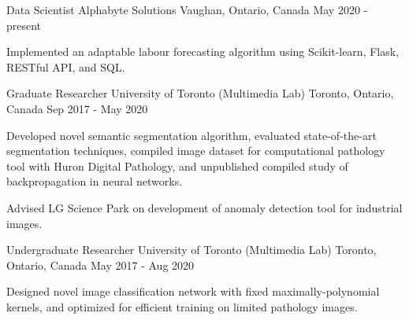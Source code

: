 

\begin{cventries}

  \cventry
    {Data Scientist} %
    {Alphabyte Solutions} %
    {Vaughan, Ontario, Canada} %
    {May 2020 - present} %
    {
      \begin{cvitems} %
        \item {Implemented an adaptable labour forecasting algorithm using Scikit-learn, Flask, RESTful API, and SQL.}
      \end{cvitems}
    }

  \cventry
    {Graduate Researcher} %
    {University of Toronto (Multimedia Lab)} %
    {Toronto, Ontario, Canada} %
    {Sep 2017 - May 2020} %
    {
      \begin{cvitems} %
        \item {Developed novel semantic segmentation algorithm, evaluated state-of-the-art segmentation techniques, compiled image dataset for computational pathology tool with Huron Digital Pathology, and unpublished compiled study of backpropagation in neural networks.}
        \item {Advised LG Science Park on development of anomaly detection tool for industrial images.}
      \end{cvitems}
    }

  \cventry
    {Undergraduate Researcher} %
    {University of Toronto (Multimedia Lab)} %
    {Toronto, Ontario, Canada} %
    {May 2017 - Aug 2020} %
    {
      \begin{cvitems} %
        \item {Designed novel image classification network with fixed maximally-polynomial kernels, and optimized for efficient training on limited pathology images.}
      \end{cvitems}
    }
		

\end{cventries}
